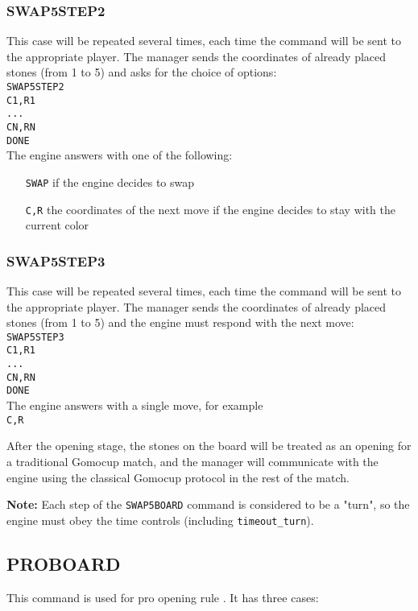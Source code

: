 \documentclass[12pt,a4paper]{article}
\begin{document}
\subsubsection{SWAP5STEP2}
This case will be repeated several times, each time the command will be sent to the appropriate player. The manager sends the coordinates of already placed stones (from 1 to 5) and asks for the choice of options:\\
\texttt{SWAP5STEP2}\\
\texttt{C1,R1}\\
\texttt{...}\\
\texttt{CN,RN}\\
\texttt{DONE}\\
The engine answers with one of the following:
\begin{enumerate}[leftmargin=7.5em]
\item[\texttt{SWAP}]{if the engine decides to swap}
\item[\texttt{C,R}]{the coordinates of the next move if the engine decides to stay with the current color}
\end{enumerate}

\subsubsection{SWAP5STEP3}
This case will be repeated several times, each time the command will be sent to the appropriate player. The manager sends the coordinates of already placed stones (from 1 to 5) and the engine must respond with the next move:\\
\texttt{SWAP5STEP3}\\
\texttt{C1,R1}\\
\texttt{...}\\
\texttt{CN,RN}\\
\texttt{DONE}\\
The engine answers with a single move, for example\\
\texttt{C,R}

After the opening stage, the stones on the board will be treated as an opening for a traditional Gomocup match, and the manager will communicate with the engine using the classical Gomocup protocol in the rest of the match.

\textbf{Note:} Each step of the \texttt{SWAP5BOARD} command is considered to be a "turn", so the engine must obey the time controls (including \texttt{timeout{\_}turn}).


\subsection{PROBOARD}
\label{cmd_pro}
This command is used for pro opening rule \cite{gomoku_opening_rules}. It has three cases:
\end{document}
